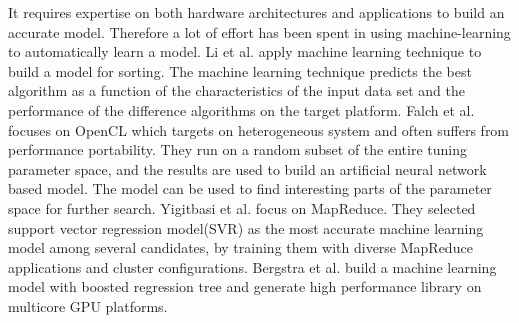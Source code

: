 It requires expertise on both hardware architectures and applications to build an accurate model. Therefore a lot of 
effort has been spent in using machine-learning to automatically learn a model. Li et al.\cite{li2004dynamically} apply machine learning 
technique to build a model for sorting. The machine learning technique predicts the best algorithm as a function of the 
characteristics of the input data set and the performance of the difference algorithms on the target platform. Falch et al.\cite{falch2015machine}
focuses on OpenCL which targets on heterogeneous system and often suffers from performance portability. They run on a random
subset of the entire tuning parameter space, and the results are used to build an artificial neural network based model. 
The model can be used to find interesting parts of the parameter space for further search. Yigitbasi et al.\cite{yigitbasi2013towards} focus on MapReduce.
They selected support vector regression model(SVR) as the most accurate machine learning model among several candidates, by 
training them with diverse MapReduce applications and cluster configurations. Bergstra et al.\cite{bergstra2012machine} build a machine learning model
with boosted regression tree and generate high performance library on multicore GPU platforms.




